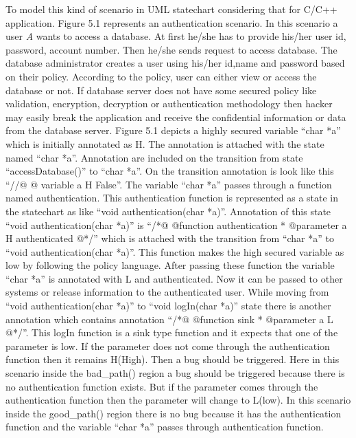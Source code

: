 To model this kind of scenario in UML statechart considering that for C/C++ application. Figure 5.1 represents an authentication scenario. In this scenario a user \emph{A} wants to access a database. At first he/she has to provide his/her user id, password, account number. Then he/she sends request to access database. The database administrator creates a user using his/her id,name and password based on their policy. According to the policy, user can either view or access the database or not. If database server does not have some secured policy like validation, encryption, decryption or authentication methodology then hacker may easily break the application and receive the confidential information or data from the database server. Figure 5.1 depicts a highly secured variable \enquote{char *a} which is initially annotated as H. The annotation is attached with the state named \enquote{char *a}. Annotation are included on the transition from state \enquote{accessDatabase()} to \enquote{char *a}. On the transition annotation is look like this \enquote{//@ @ variable a H False}. The variable \enquote{char *a} passes through a function named authentication. This authentication function is represented as a state in the statechart as like \enquote{void authentication(char *a)}. Annotation of this state \enquote{void authentication(char *a)} is \enquote{/*@ @function authentication
* @parameter a H authenticated @*/} which is attached with the transition from \enquote{char *a} to \enquote{void authentication(char *a)}. This function makes the high secured variable as low by following the policy language. After passing these function the variable \enquote{char *a} is annotated with L and authenticated. Now it can be passed to other systems or release information to the authenticated user. While moving from \enquote{void authentication(char *a)} to \enquote{void logIn(char *a)} state there is another annotation which contains annotation \enquote{/*@ @function sink * @parameter a L @*/}. This logIn function is a sink type function and it expects that one of the parameter is low. If the parameter does not come through the authentication function then it remains H(High). Then a bug should be triggered. Here in this scenario inside the bad\_path() region a bug should be triggered because there is no authentication function exists. But if the parameter comes through the authentication function then the parameter will change to L(low). In this scenario inside the good\_path() region there is no bug because it has the authentication function and the variable \enquote{char *a} passes through authentication function.


